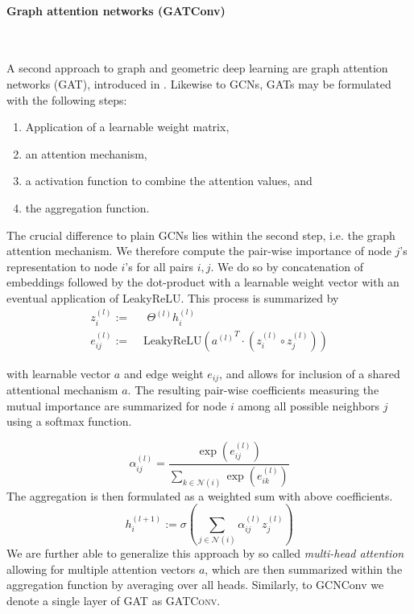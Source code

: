 \documentclass[]{article}
\begin{document}
\paragraph{Graph attention networks (GATConv)}\mbox{}\\
\label{sec:GATConv}

A second approach to graph and geometric deep learning are graph attention networks (GAT), introduced in \citet{chorowski2015attention}. Likewise to GCNs, GATs may be formulated with the following steps:

\begin{enumerate}
	\item Application of a learnable weight matrix,
	\item an attention mechanism,
	\item a activation function to combine the attention values, and 
	\item the aggregation function.
\end{enumerate}
The crucial difference to plain GCNs lies within the second step, i.e. the graph attention mechanism. We therefore compute the pair-wise importance of node $j$'s representation to node $i$'s for all pairs $i,j$. We do so by concatenation of embeddings followed by the dot-product with a learnable weight vector with an eventual application of LeakyReLU. This process is summarized by
\begin{align}
	z^{(l)}_i:=& \text{ }\Theta^{(l)}h^{(l)}_i\\
	e^{(l)}_{ij}:=&\text{ LeakyReLU}\left( {a^{(l)}}^T \cdot \left( z^{(l)}_i \circ z^{(l)}_j \right) \right)
\end{align}

with learnable vector $a$ and edge weight $e_{ij}$, and allows for inclusion of a shared attentional mechanism $a$. The resulting pair-wise coefficients measuring the mutual importance are summarized for node $i$ among all possible neighbors $j$ using a softmax function.

\begin{equation}
	\alpha^{(l)}_{ij}=\frac{\exp\left( e^{(l)}_{ij} \right)}{\sum_{k\in\mathcal{N}(i)}\exp\left( e^{(l)}_{ik} \right) }
\end{equation}
The aggregation is then formulated as a weighted sum with above coefficients.
\begin{equation}
	h^{(l+1)}_i := \sigma\left( \sum_{j\in\mathcal{N}(i)} \alpha^{(l)}_{ij} z^{(l)} _j \right)
\end{equation}
We are further able to generalize this approach by so called \textit{multi-head attention} allowing for multiple attention vectors $a$, which are then summarized within the aggregation function by averaging over all heads. Similarly, to GCNConv we denote a single layer of GAT as \textsc{GATConv}.\\
\end{document}
